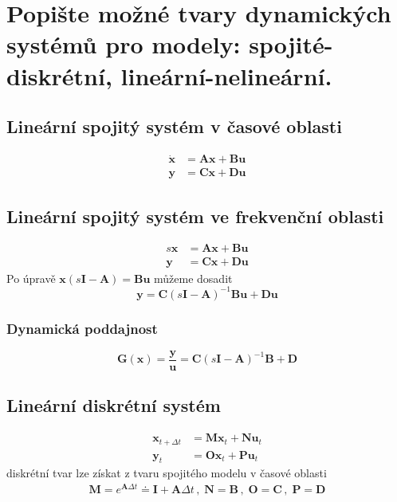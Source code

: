 \documentclass{article}
\begin{document}
	\section{Popište možné tvary dynamických systémů pro modely: spojité-diskrétní, lineární-nelineární.}

	\subsection*{Lineární spojitý systém v časové oblasti}
	\begin{align*}
		\bm{\dot{x}} &= \bm{A}\bm{x} + \bm{B}\bm{u} \\
		\bm{y} &= \bm{C}\bm{x} + \bm{D}\bm{u}
	\end{align*}
	\subsection*{Lineární spojitý systém ve frekvenční oblasti}
	\begin{align*}
		s\bm{x} &= \bm{A}\bm{x} + \bm{B}\bm{u} \\
		\bm{y} &= \bm{C}\bm{x} + \bm{D}\bm{u}
	\end{align*}
	Po úpravě $\bm{x}(s\bm{I} - \bm{A}) = \bm{B}\bm{u}$ můžeme dosadit
	\begin{equation}
		\bm{y} = \bm{C}(s\bm{I}-\bm{A})^{-1}\bm{B}\bm{u}+\bm{D}\bm{u}
	\end{equation}
	\subsubsection*{Dynamická poddajnost}
	\begin{equation}
	\bm{G}(\bm{x}) = \frac{\bm{y}}{\bm{u}} = \bm{C}(s\bm{I}-\bm{A})^{-1}\bm{B}+\bm{D}
	\end{equation}
	\subsection*{Lineární diskrétní systém}
	\begin{align*}
		\bm{x}_{t+\Delta t} &= \bm{M}\bm{x}_t + \bm{N}\bm{u}_t \\
		\bm{y}_t &= \bm{O}\bm{x}_t + \bm{P}\bm{u}_t
	\end{align*}
	diskrétní tvar lze získat z tvaru spojitého modelu v časové oblasti
	\begin{align*}
		\bm{M} = e^{\bm{A}\Delta t} \doteq \bm{I} + \bm{A}\Delta t
		\,,\;
		\bm{N} = \bm{B}
		\,,\;
		\bm{O} = \bm{C}
		\,,\;
		\bm{P} = \bm{D}
	\end{align*}
\end{document}
